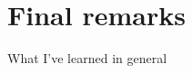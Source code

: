 \documentclass[a4paper,10pt,twoside,headings=small,bibliography=totocnumbered,headsepline]{scrartcl}
\begin{document}












\newpage
\section{Final remarks}
\label{sec:final_remarks}

What I've learned in general 

\newpage


\end{document}

